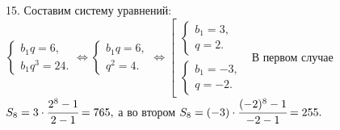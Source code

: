 15. Составим систему уравнений: $\begin{cases}b_1q=6,\\b_1q^3=24.\end{cases}\Leftrightarrow\begin{cases}b_1q=6,\\q^2=4.\end{cases}
\Leftrightarrow\left[\begin{array}{l}\begin{cases}b_1=3,\\q=2.\end{cases}\\ \begin{cases}b_1=-3,\\q=-2.\end{cases}\end{array}\right.$ В первом случае
$S_8=3\cdot\cfrac{2^8-1}{2-1}=765,$ а во втором $S_8=(-3)\cdot\cfrac{(-2)^8-1}{-2-1}=255.$\\
